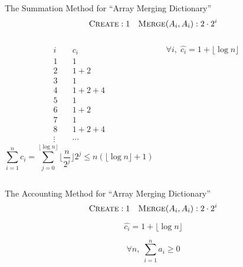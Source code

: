 \begin{frame}{}
  \begin{exampleblock}{The Summation Method for ``Array Merging Dictionary''}
    \[
      \textsc{Create}: 1 \quad \textsc{Merge$(A_i, A_i)$}: 2 \cdot 2^i
    \]
  \end{exampleblock}

  \begin{columns}
      \pause
      \begin{align*}
	i & \quad c_i \\
	1 & \quad 1  \\
	2 & \quad 1 + 2 \\
	3 & \quad 1 \\
	4 & \quad 1 + 2 + 4 \\
	5 & \quad 1 \\
	6 & \quad 1 + 2 \\
	7 & \quad 1 \\
	8 & \quad 1 + 2 + 4 \\
	\vdots & \quad \cdots
      \end{align*}
      \pause
      \[
	\sum_{i=1}^{n} c_i = \sum_{j=0}^{\lfloor \log n \rfloor} \lfloor \frac{n}{2^j} \rfloor 2^j \le n (\lfloor \log n \rfloor + 1)
      \]

      \pause
      \[
	\forall i,\; \hat{c_i} = 1 + \lfloor \log n \rfloor
      \]
  \end{columns}
\end{frame}

\begin{frame}{}
  \begin{exampleblock}{The Accounting Method for ``Array Merging Dictionary''}
    \[
      \textsc{Create}: 1 \quad \textsc{Merge$(A_i, A_i)$}: 2 \cdot 2^i
    \]
  \end{exampleblock}

  \pause
  \[
    \hat{c_i} = 1 + \lfloor \log n \rfloor
  \]

  \pause

  \pause
  \[
    \forall n,\; \sum_{i=1}^{n} a_i \geq 0
  \]
\end{frame}

